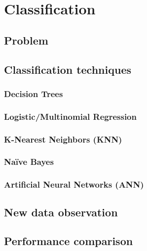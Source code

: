 \chapter{Classification}

\section{Problem}

\section{Classification techniques}

\subsection{Decision Trees}
\subsection{Logistic/Multinomial Regression}
\subsection{K-Nearest Neighbors (KNN)}
\subsection{Naïve Bayes}
\subsection{Artificial Neural Networks (ANN)}


\section{New data observation}


\section{Performance comparison}
